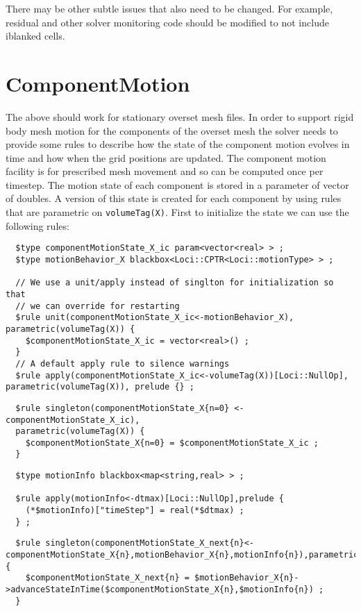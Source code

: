 \documentclass{article}
\begin{document}
There may be other subtle issues that also need to be changed.  For
example, residual and other solver monitoring code should be modified
to not include iblanked cells. 

\section{ComponentMotion}

The above should work for stationary overset mesh files.  In order to
support rigid body mesh motion for the components of the overset mesh
the solver needs to provide some rules to describe how the state of
the component motion evolves in time and how when the grid positions
are updated.  The component motion facility is for prescribed mesh
movement and so can be computed once per timestep. The motion state of
each component is stored in a parameter of vector of doubles.  A
version of this state is created for each component by using rules
that are parametric on {\tt volumeTag(X)}.  First to initialize the state we can use the following rules:

\begin{verbatim}
  $type componentMotionState_X_ic param<vector<real> > ;
  $type motionBehavior_X blackbox<Loci::CPTR<Loci::motionType> > ;

  // We use a unit/apply instead of singlton for initialization so that 
  // we can override for restarting
  $rule unit(componentMotionState_X_ic<-motionBehavior_X), parametric(volumeTag(X)) {
    $componentMotionState_X_ic = vector<real>() ;
  }
  // A default apply rule to silence warnings
  $rule apply(componentMotionState_X_ic<-volumeTag(X))[Loci::NullOp], parametric(volumeTag(X)), prelude {} ;
\end{verbatim}

\begin{verbatim}
  $rule singleton(componentMotionState_X{n=0} <- componentMotionState_X_ic),
  parametric(volumeTag(X)) {
    $componentMotionState_X{n=0} = $componentMotionState_X_ic ;
  }
\end{verbatim}

\begin{verbatim}
  $type motionInfo blackbox<map<string,real> > ;

  $rule apply(motionInfo<-dtmax)[Loci::NullOp],prelude {
    (*$motionInfo)["timeStep"] = real(*$dtmax) ;
  } ;
\end{verbatim}

\begin{verbatim}
  $rule singleton(componentMotionState_X_next{n}<-componentMotionState_X{n},motionBehavior_X{n},motionInfo{n}),parametric(volumeTag(X)) {
    $componentMotionState_X_next{n} = $motionBehavior_X{n}->advanceStateInTime($componentMotionState_X{n},$motionInfo{n}) ;
  }
\end{verbatim}
\end{document}

